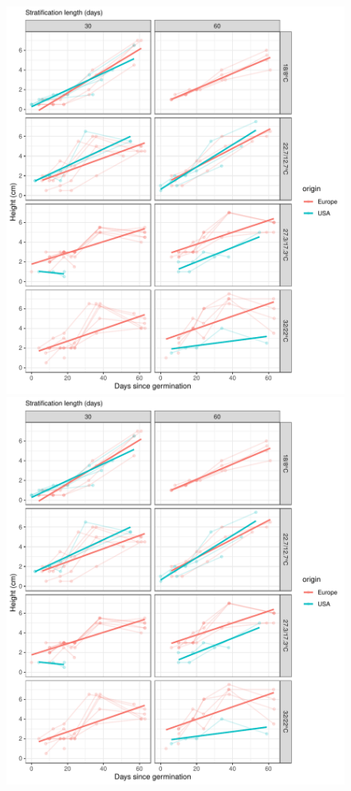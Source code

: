 \documentclass[12pt]{article}\usepackage[]{graphicx}\usepackage[]{color}
\begin{document}
\begin{figure}[H]\ContinuedFloat
  \centering
  {\includegraphics[scale=.5, page=5, trim=0cm 0cm 2.9cm 0cm, clip=TRUE]{supplement.pdf}}
  {\includegraphics[scale=.5, page=6, trim=0cm 0cm 2.9cm 0cm, clip=TRUE]{supplement.pdf}}

\end{figure}
\end{document}
